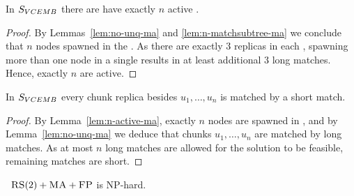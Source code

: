 \begin{lemma}
  In $S_{VCEMB}$ there are have exactly $n$ active \TripleGadgets{}.
  \label{lem:n-active-ma}
\end{lemma}
\begin{proof}
  By Lemmas~\ref{lem:no-unq-ma} and \ref{lem:n-matchsubtree-ma} we conclude that $n$ nodes spawned in the \TripleGadgets.
As there are exactly $3$ replicas in each \TripleGadget{}, spawning more than one node in a single \TripleGadget{} results in at least additional $3$ long matches.
Hence, exactly $n$ \TripleGadgets{} are active.
\end{proof}

\begin{lemma}
  In $S_{VCEMB}$ every chunk replica besides $u_1, \ldots, u_n$ is matched by a short match.
  \label{lem:short-ma}
\end{lemma}
\begin{proof}
  By Lemma~\ref{lem:n-active-ma}, exactly $n$ nodes are spawned in \TripleGadgets{}, and by Lemma~\ref{lem:no-unq-ma} we deduce that chunks $u_1, \ldots, u_n$ are matched by long matches.
  As at most $n$ long matches are allowed for the solution to be feasible, remaining matches are short.
\end{proof}

\begin{theorem}
  ~$\textsc{RS}(2)+\textsc{MA}+\textsc{FP}$ is NP-hard.
  \label{th:ma-reduction}
\end{theorem}

